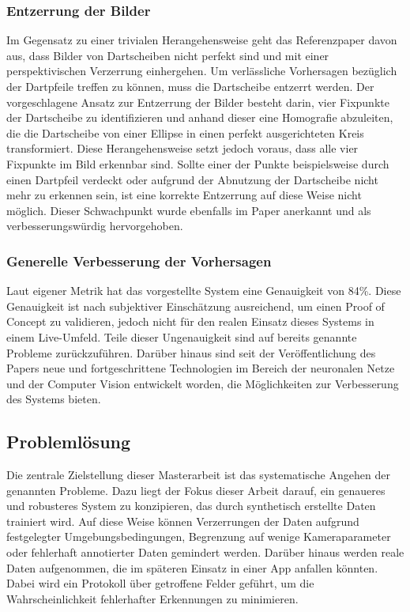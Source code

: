 \subsubsection{Entzerrung der Bilder}
\label{sec:ziele:schwachstellen:entzerrung}

Im Gegensatz zu einer trivialen Herangehensweise geht das Referenzpaper davon aus, dass Bilder von Dartscheiben nicht perfekt sind und mit einer perspektivischen Verzerrung einhergehen. Um verlässliche Vorhersagen bezüglich der Dartpfeile treffen zu können, muss die Dartscheibe entzerrt werden. Der vorgeschlagene Ansatz zur Entzerrung der Bilder besteht darin, vier Fixpunkte der Dartscheibe zu identifizieren und anhand dieser eine Homografie abzuleiten, die die Dartscheibe von einer Ellipse in einen perfekt ausgerichteten Kreis transformiert. Diese Herangehensweise setzt jedoch voraus, dass alle vier Fixpunkte im Bild erkennbar sind. Sollte einer der Punkte beispielsweise durch einen Dartpfeil verdeckt oder aufgrund der Abnutzung der Dartscheibe nicht mehr zu erkennen sein, ist eine korrekte Entzerrung auf diese Weise nicht möglich. Dieser Schwachpunkt wurde ebenfalls im Paper anerkannt und als verbesserungswürdig hervorgehoben.

\subsubsection{Generelle Verbesserung der Vorhersagen}
\label{sec:ziele:schwachstellen:verbesserung}

Laut eigener Metrik hat das vorgestellte System eine Genauigkeit von 84\%. Diese Genauigkeit ist nach subjektiver Einschätzung ausreichend, um einen Proof of Concept zu validieren, jedoch nicht für den realen Einsatz dieses Systems in einem Live-Umfeld. Teile dieser Ungenauigkeit sind auf bereits genannte Probleme zurückzuführen. Darüber hinaus sind seit der Veröffentlichung des Papers neue und fortgeschrittene Technologien im Bereich der neuronalen Netze und der Computer Vision entwickelt worden, die Möglichkeiten zur Verbesserung des Systems bieten.


\subsection{Problemlösung}
\label{sec:ziele:problemlösung}

Die zentrale Zielstellung dieser Masterarbeit ist das systematische Angehen der genannten Probleme. Dazu liegt der Fokus dieser Arbeit darauf, ein genaueres und robusteres System zu konzipieren, das durch synthetisch erstellte Daten trainiert wird. Auf diese Weise können Verzerrungen der Daten aufgrund festgelegter Umgebungsbedingungen, Begrenzung auf wenige Kameraparameter oder fehlerhaft annotierter Daten gemindert werden. Darüber hinaus werden reale Daten aufgenommen, die im späteren Einsatz in einer App anfallen könnten. Dabei wird ein Protokoll über getroffene Felder geführt, um die Wahrscheinlichkeit fehlerhafter Erkennungen zu minimieren.

